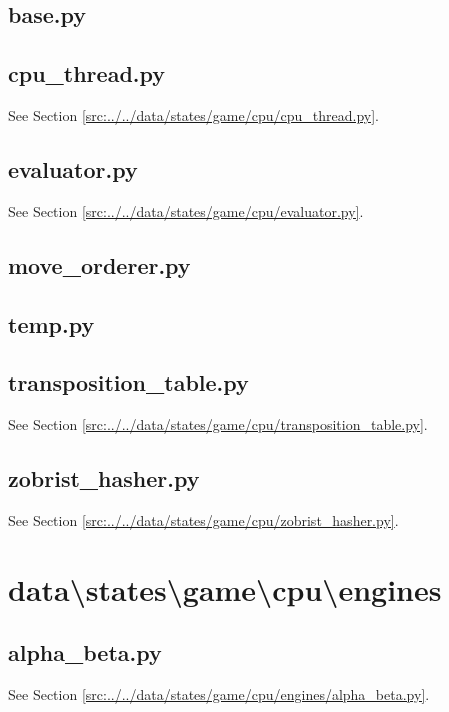 \documentclass[../main/main.tex]{subfiles}
\begin{document}
\subsection{base.py}

\label{src:data/states/game/cpu/base.py}

\subsection{cpu\_thread.py}
See Section \ref{src:../../data/states/game/cpu/cpu_thread.py}.

\subsection{evaluator.py}
See Section \ref{src:../../data/states/game/cpu/evaluator.py}.

\subsection{move\_orderer.py}

\label{src:data/states/game/cpu/move_orderer.py}

\subsection{temp.py}

\label{src:data/states/game/cpu/temp.py}

\subsection{transposition\_table.py}
See Section \ref{src:../../data/states/game/cpu/transposition_table.py}.

\subsection{zobrist\_hasher.py}
See Section \ref{src:../../data/states/game/cpu/zobrist_hasher.py}.

\section{data\textbackslash states\textbackslash game\textbackslash cpu\textbackslash engines}
\subsection{alpha\_beta.py}
See Section \ref{src:../../data/states/game/cpu/engines/alpha_beta.py}.
\end{document}

